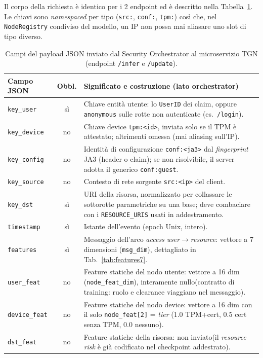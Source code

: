 Il corpo della richiesta è identico per i 2 endpoint ed è descritto nella Tabella~\ref{tab:apipayload}. Le chiavi sono \emph{namespaced} per tipo (\texttt{src:}, \texttt{conf:}, \texttt{tpm:}) così che, nel \texttt{NodeRegistry} condiviso del modello, un IP non possa mai aliasare uno slot di tipo diverso.

\begin{table}[ht!]
\centering
\footnotesize
\renewcommand{\arraystretch}{1.3}
\begin{tabularx}{\textwidth}{l c X}
\toprule
\textbf{Campo JSON} & \textbf{Obbl.} & \textbf{Significato e costruzione (lato orchestrator)} \\
\midrule
\texttt{key\_user}    & sì & Chiave entità utente: lo \texttt{UserID} dei claim, oppure \texttt{anonymous} sulle rotte non autenticate (es.\ \texttt{/login}). \\
\texttt{key\_device}  & no & Chiave device \texttt{tpm:<id>}, inviata solo se il TPM è attestato; altrimenti omessa (mai aliasing sull'IP). \\
\texttt{key\_config}  & no & Identità di configurazione \texttt{conf:<ja3>} dal \textit{fingerprint} JA3 (header o claim); se non risolvibile, il server adotta il generico \texttt{conf:guest}. \\
\texttt{key\_source}  & no & Contesto di rete sorgente \texttt{src:<ip>} del client. \\
\texttt{key\_dst}     & sì & URI della risorsa, normalizzato per collassare le sottorotte parametriche su una base; deve combaciare con i \texttt{RESOURCE\_URIS} usati in addestramento. \\
\texttt{timestamp}    & sì & Istante dell'evento (epoch Unix, intero). \\
\texttt{features}     & sì & Messaggio dell'arco \textit{access} \textit{user}$\rightarrow$\textit{resource}: vettore a 7 dimensioni (\texttt{msg\_dim}), dettagliato in Tab.~\ref{tab:features7}. \\
\texttt{user\_feat}   & no & Feature statiche del nodo utente: vettore a 16 dim (\texttt{node\_feat\_dim}), interamente nullo(contratto di training: ruolo e clearance viaggiano nel messaggio). \\
\texttt{device\_feat} & no & Feature statiche del nodo device: vettore a 16 dim con il solo \texttt{node\_feat[2]} = \textit{tier} ($1.0$ TPM+cert, $0.5$ cert senza TPM, $0.0$ nessuno). \\
\texttt{dst\_feat}    & no & Feature statiche della risorsa: non inviato(il \textit{resource risk} è già codificato nel checkpoint addestrato). \\
\bottomrule
\end{tabularx}
\caption{Campi del payload JSON inviato dal Security Orchestrator al microservizio TGN (endpoint \texttt{/infer} e \texttt{/update}).}
\label{tab:apipayload}
\end{table}

